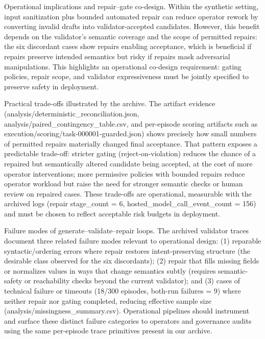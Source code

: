 \documentclass[conference]{IEEEtran}
\begin{document}
Operational implications and repair--gate co-design. Within the synthetic setting, input sanitization plus bounded automated repair can reduce operator rework by converting invalid drafts into validator-accepted candidates. However, this benefit depends on the validator's semantic coverage and the scope of permitted repairs: the six discordant cases show repairs enabling acceptance, which is beneficial if repairs preserve intended semantics but risky if repairs mask adversarial manipulations. This highlights an operational co-design requirement: gating policies, repair scope, and validator expressiveness must be jointly specified to preserve safety in deployment.

Practical trade-offs illustrated by the archive. The artifact evidence (analysis/deterministic\_reconciliation.json, analysis/paired\_contingency\_table.csv, and per-episode scoring artifacts such as execution/scoring/task-000001-guarded.json) shows precisely how small numbers of permitted repairs materially changed final acceptance. That pattern exposes a predictable trade-off: stricter gating (reject-on-violation) reduces the chance of a repaired but semantically altered candidate being accepted, at the cost of more operator interventions; more permissive policies with bounded repairs reduce operator workload but raise the need for stronger semantic checks or human review on repaired cases. These trade-offs are operational, measurable with the archived logs (repair stage\_count = 6, hosted\_model\_call\_event\_count = 156) and must be chosen to reflect acceptable risk budgets in deployment.

Failure modes of generate--validate--repair loops. The archived validator traces document three related failure modes relevant to operational design: (1) reparable syntactic/ordering errors where repair restores intent-preserving structure (the desirable class observed for the six discordants); (2) repair that fills missing fields or normalizes values in ways that change semantics subtly (requires semantic-safety or reachability checks beyond the current validator); and (3) cases of technical failure or timeouts (18/300 episodes, both-run failures = 9) where neither repair nor gating completed, reducing effective sample size (analysis/missingness\_summary.csv). Operational pipelines should instrument and surface these distinct failure categories to operators and governance audits using the same per-episode trace primitives present in our archive.
\end{document}
